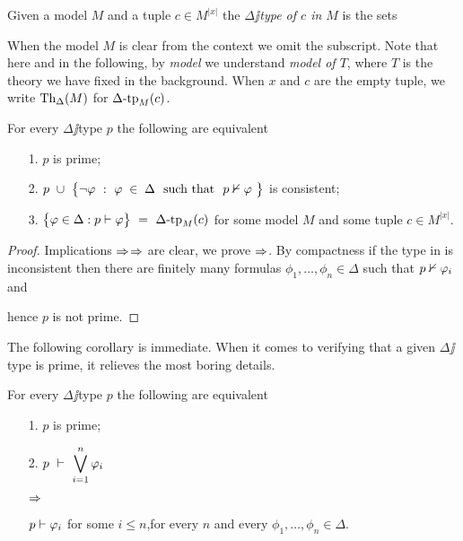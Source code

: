 \documentclass[creche.tex]{subfiles}
\begin{document}
Given a model $M$ and a tuple $c\in M^{|x|}$ the \emph{$\Delta\jj$type of $c$ in $M$\/} is the sets


When the model $M$ is clear from the context we omit the subscript. Note that here and in the following, by \textit{model\/} we understand \textit{model of $T$}, where $T$ is the theory we have fixed in the background. When $x$ and $c$ are the empty tuple, we write \emph{$\textrm{Th}_\Delta(M)$} for $\Delta\mbox{-}\textrm{tp}_M(c)$.

\begin{lemma}\label{lemmatipiprimiconsistenti}
For every $\Delta\jj$type $p$ the following are equivalent
\begin{itemize}
\item[1.] $p$ is prime;
\item[2.] $p\ \cup\ \big\{\neg\phi\ :\  \phi\;\in\;\Delta\ \ \textrm{such that}\ \ p\notproves\phi\ \big\}$ is consistent;
\item[3.] $\big\{\phi\in\Delta : p\proves\phi\big\}\ = \ \Deltatp_M(c)$ for some model $M$ and some tuple $c\in M^{|x|}$.
\end{itemize}
\end{lemma}
\begin{proof}
Implications $\Rightarrow$$\Rightarrow$ are clear, we prove $\Rightarrow$. By compactness if the type in  is inconsistent then there are finitely many formulas $\phi_1,\dots,\phi_n\in\Delta$ such that $p\nvdash\varphi_i$ and


hence $p$ is not prime.
\end{proof}

The following corollary is immediate. When it comes to verifying that a given $\Delta\jj$type is prime, it relieves the most boring details.

\begin{corollary}\label{coroll_test_primalita}
For every $\Delta\jj$type $p$ the following are equivalent
\begin{itemize}
\item[1.] $p$ is prime;
\item[2.] $\displaystyle p\ \proves\ \bigvee^n_{i=1}\phi_i$\parbox{6ex}{\hfil$\Rightarrow$}$p\vdash\varphi_i$ for some $i\le n$,\hfill for every $n$ and every $\phi_1,\dots,\phi_n\in\Delta$.\QED
\end{itemize}
\end{corollary}
\end{document}
